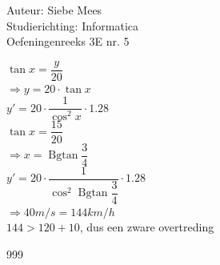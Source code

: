 \documentclass[a4paper]{article}
\newcommand{\Bgtan}{\operatorname{Bgtan}}
\begin{document}
  
\noindent \large Auteur: Siebe Mees \\
\noindent \large Studierichting: Informatica\\
\noindent \large Oefeningenreeks 3E nr. 5\\

\medskip

\normalsize


$\tan x = \dfrac{y}{20} $ \\

$ \Rightarrow y = 20 \cdot \tan x$ \\

$y' = 20 \cdot \dfrac{1}{\cos ^2 x} \cdot 1.28$ \\

$\tan x = \dfrac{15}{20} $ \\

$ \Rightarrow x = \Bgtan \dfrac{3}{4}$ \\

$y' = 20 \cdot \dfrac{1}{\cos ^2 \operatorname{Bgtan} \dfrac{3}{4}} \cdot 1.28 $ \\

$ \Rightarrow 40 m/s = 144 km/h $ \\

$ 144 > 120+10$, dus een zware overtreding \\


\begin{thebibliography}{999}
\end{thebibliography}
\end{document}
